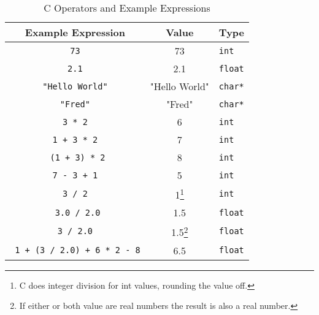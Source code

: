 \begin{table}[h]
  \begin{minipage}{\textwidth}
  \centering
  \begin{tabular}{|c|c|l|}
    \hline
    \textbf{Example Expression} & \textbf{Value} & \textbf{Type} \\
    \hline
    \texttt{ 73 }     &   73                 & \texttt{int}  \\
    \texttt{ 2.1 }      & 2.1   & \texttt{float}    \\
    \texttt{ "Hello World" }      &   "Hello World"    & \texttt{char*}   \\
    \texttt{ "Fred" }      &   "Fred"    & \texttt{char*}   \\
    \texttt{ 3 * 2 } & 6 & \texttt{int} \\
    \texttt{ 1 + 3 * 2 }  & 7 & \texttt{int} \\
    \texttt{ (1 + 3) * 2} & 8 & \texttt{int} \\
    \texttt{ 7 - 3 + 1 }  & 5 & \texttt{int} \\
    \texttt{ 3 / 2 } & 1\footnote{C does integer division for int values, rounding the value off.} & \texttt{int} \\
    \texttt{ 3.0 / 2.0} & 1.5 & \texttt{float} \\
    \texttt{ 3 / 2.0 } & 1.5\footnote{If either or both value are real numbers the result is also a real number.} & \texttt{float} \\
    \texttt{ 1 + (3 / 2.0) + 6 * 2 - 8} & 6.5 & \texttt{float} \\
    \hline
  \end{tabular}
\end{minipage}
  \caption{C Operators and Example Expressions}
  \label{tbl:program-creation-c example expresions}
\end{table}




